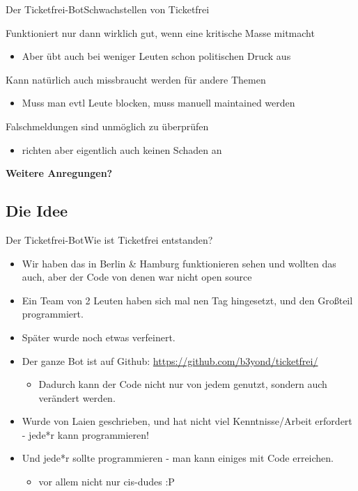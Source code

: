 \documentclass[10pt]{beamer}
\begin{document}
{\begin{frame}{Der Ticketfrei-Bot}{Schwachstellen von Ticketfrei}
\begin{block}{Funktioniert nur dann wirklich gut, wenn eine kritische Masse mitmacht}
  \begin{itemize}
    \item Aber übt auch bei weniger Leuten schon politischen Druck aus
  \end{itemize}
\end{block}

\begin{block}{Kann natürlich auch missbraucht werden für andere Themen}
  \begin{itemize}
    \item Muss man evtl Leute blocken, muss manuell maintained werden
  \end{itemize}
\end{block}

\begin{block}{Falschmeldungen sind unmöglich zu überprüfen}
  \begin{itemize}
    \item richten aber eigentlich auch keinen Schaden an
  \end{itemize}
\end{block}

\textbf{Weitere Anregungen?}

\end{frame}

\subsection{Die Idee}
\begin{frame}{Der Ticketfrei-Bot}{Wie ist Ticketfrei entstanden?}

\begin{itemize}
    \item<1-> Wir haben das in Berlin \& Hamburg funktionieren sehen und wollten das auch, aber der Code von denen war nicht open source
    \item<1-> Ein Team von 2 Leuten haben sich mal nen Tag hingesetzt, und den Großteil programmiert.
    \item<1-> Später wurde noch etwas verfeinert.
    \item<2-> Der ganze Bot ist auf Github: \url{https://github.com/b3yond/ticketfrei/}
  \begin{itemize}
    \item Dadurch kann der Code nicht nur von jedem genutzt, sondern auch verändert werden.
  \end{itemize}
    \item<2-> Wurde von Laien geschrieben, und hat nicht viel Kenntnisse/Arbeit erfordert - jede*r kann programmieren!
	\item<2-> Und jede*r sollte programmieren - man kann einiges mit Code erreichen.
  \begin{itemize}
    \item vor allem nicht nur cis-dudes :P
  \end{itemize}
\end{itemize}
    


\end{frame}}
\end{document}
